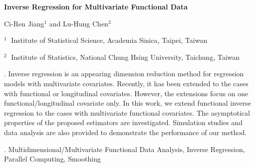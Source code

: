 \documentclass[12pt]{article}
\begin{document}
\begin{flushleft}


{\LARGE\bf Inverse Regression for Multivariate Functional Data}


\vspace{1.0cm}

Ci-Ren Jiang$^1$ and Lu-Hung Chen$^2$

\begin{description}

\item $^1 \;$ Institute of Statistical Science, Academia Sinica, Taipei, Taiwan

\item $^2 \;$ Institute of Statistics, National Chung Hsing University, Taichung, Taiwan


\end{description}

\end{flushleft}


\vspace{0.75cm}

. Inverse regression is an appearing dimension reduction method for regression models with multivariate covariates. Recently, it has been extended to the cases with functional or longitudinal covariates. However, the extensions focus on one functional/longitudinal covariate only. In this work, we extend functional inverse regression to the cases with multivariate functional covariates. The asymptotical properties of the proposed estimators are investigated. Simulation studies and data analysis are also provided to demonstrate the performance of our method.

\vskip 2mm

.
Multidimensional/Multivariate Functional Data Analysis, Inverse Regression, Parallel Computing, Smoothing
\end{document}

